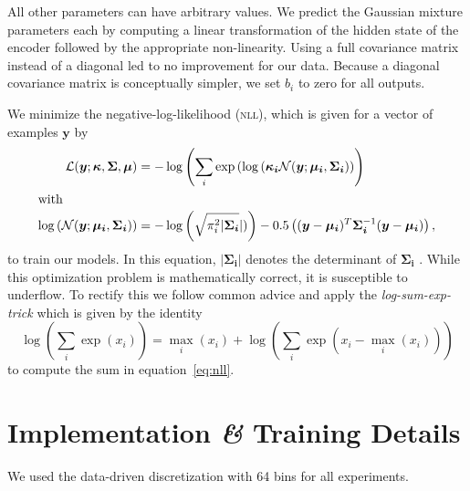 \documentclass[nobib, a4paper]{tufte-handout}
\begin{document}
All other parameters can have arbitrary values.
We predict the Gaussian mixture parameters each by computing a linear transformation of the hidden state of the encoder followed by the appropriate non-linearity.
Using a full covariance matrix instead of a diagonal led to no improvement for our data.
Because a diagonal covariance matrix is conceptually simpler, we set \(b_i\) to zero for all outputs.%

We minimize the negative-log-likelihood (\textsc{nll}), which is given for a vector of examples \(\bm{y}\) by
\begin{align}
  \label{eq:nll}
 \mathcal{L} (\bm{y}; \bm{\kappa}, \bm{\Sigma}, \bm{\mu}) &= - \log \left(  \sum_i \exp \left(  \log \left( \bm{\kappa_i} \mathcal{N} (\bm{y}; \bm{\mu_i}, \bm{\Sigma_i} \right) \right) \right) \\ 
  \intertext{with}
  \log \left( \mathcal{N} (\bm{y}; \bm{\mu_i}, \bm{\Sigma_i}) \right) &= 
 -\log \left( \sqrt{\pi_i^2 \vert \bm{\Sigma_i}} \vert)  \right) - 0.5 \left( (\bm{y} - \bm{\mu_i})^T \bm{\Sigma_i}^{-1} (\bm{y} - \bm{\mu_i}) \right),\nonumber
\end{align}
to train our models.
In this equation, \(\vert \bm{\Sigma_i} \vert\) denotes the determinant of \(\bm{\Sigma_i}\)%
.
While this optimization problem is mathematically correct, it is susceptible to underflow.
To rectify this we follow common advice and apply the \textit{log-sum-exp-trick} which is given by the identity
\begin{equation*}
  \log \left( \sum_i \exp (x_i) \right) = \max_i (x_i) + \log \left( \sum_i \exp (x_i - \max_i (x_i)) \right)
\end{equation*}
to compute the sum in equation~\ref{eq:nll}\autocite{mdnMaster}.

\section{Implementation \textit{\&} Training Details}
We used the data-driven discretization with 64 bins for all experiments.
\end{document}
